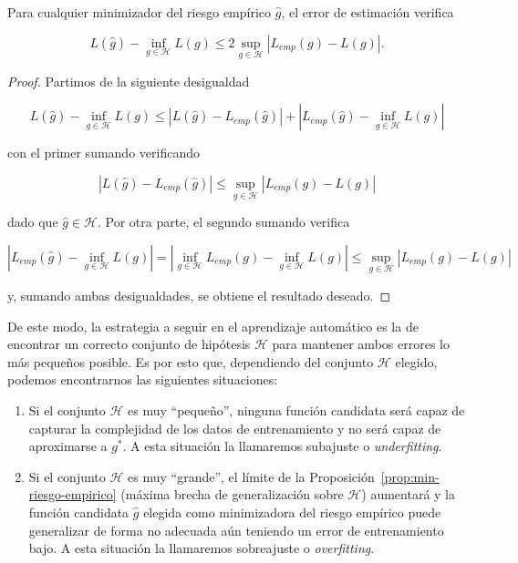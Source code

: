 \begin{proposicion}\label{prop:min-riesgo-empirico}
    Para cualquier minimizador del riesgo empírico $\hat{g}$, el error de estimación verifica

    \[ L(\hat{g}) - \inf_{g \in \mathcal{H}}L(g) \leq 2 \sup_{g \in \mathcal{H}}|L_{emp}(g) - L(g)|. \]\newline
\end{proposicion}

\begin{proof}
    Partimos de la siguiente desigualdad

    \[ L(\hat{g}) - \inf_{g \in \mathcal{H}}L(g) \leq  |L(\hat{g}) - L_{emp}(\hat{g})| + |L_{emp}(\hat{g}) - \inf_{g \in \mathcal{H}}L(g)| \]

    con el primer sumando verificando

    \[ |L(\hat{g}) - L_{emp}(\hat{g})| \leq \sup_{g \in \mathcal{H}}|L_{emp}(g) - L(g)|\]

    dado que $\hat{g} \in \mathcal{H}$. Por otra parte, el segundo sumando verifica

    \[ |L_{emp}(\hat{g}) - \inf_{g \in \mathcal{H}}L(g)| = |\inf_{g \in \mathcal{H}} L_{emp}(g) - \inf_{g \in \mathcal{H}}L(g)| \leq \sup_{g \in \mathcal{H}}|L_{emp}(g) - L(g)| \]

    y, sumando ambas desigualdades, se obtiene el resultado deseado.\newline
\end{proof}

De este modo, la estrategia a seguir en el aprendizaje automático es la de encontrar un correcto conjunto de hipótesis $\mathcal{H}$ para mantener ambos errores lo más pequeños posible. Es por esto que, dependiendo del conjunto $\mathcal{H}$ elegido, podemos encontrarnos las siguientes situaciones:

\begin{enumerate}
    \item Si el conjunto $\mathcal{H}$ es muy ``pequeño'', ninguna función candidata será capaz de capturar la complejidad de los datos de entrenamiento y no será capaz de aproximarse a $g^{*}$. A esta situación la llamaremos subajuste o \emph{underfitting}.
    \item Si el conjunto $\mathcal{H}$ es muy ``grande'', el límite de la Proposición~\ref{prop:min-riesgo-empirico} (máxima brecha de generalización sobre $\mathcal{H}$) aumentará y la función candidata $\hat{g}$ elegida como minimizadora del riesgo empírico puede generalizar de forma no adecuada aún teniendo un error de entrenamiento bajo. A esta situación la llamaremos sobreajuste o \emph{overfitting}.
\end{enumerate}

